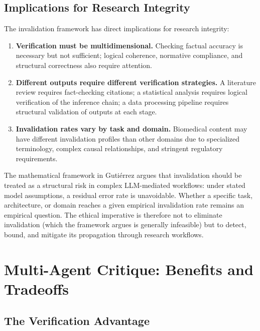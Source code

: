 \documentclass[11pt,letterpaper]{article}
\begin{document}
\subsection{Implications for Research Integrity}

The invalidation framework has direct implications for research integrity:

\begin{enumerate}[leftmargin=*]
    \item \textbf{Verification must be multidimensional.} Checking factual accuracy is necessary but not sufficient; logical coherence, normative compliance, and structural correctness also require attention.
    
    \item \textbf{Different outputs require different verification strategies.} A literature review requires fact-checking citations; a statistical analysis requires logical verification of the inference chain; a data processing pipeline requires structural validation of outputs at each stage.
    
    \item \textbf{Invalidation rates vary by task and domain.} Biomedical content may have different invalidation profiles than other domains due to specialized terminology, complex causal relationships, and stringent regulatory requirements.
\end{enumerate}

The mathematical framework in Guti\'errez \cite{gutierrez2025} argues that invalidation should be treated as a structural risk in complex LLM-mediated workflows: under stated model assumptions, a residual error rate is unavoidable. Whether a specific task, architecture, or domain reaches a given empirical invalidation rate remains an empirical question. The ethical imperative is therefore not to eliminate invalidation (which the framework argues is generally infeasible) but to detect, bound, and mitigate its propagation through research workflows.

\section{Multi-Agent Critique: Benefits and Tradeoffs}
\label{sec:multiagent}

\subsection{The Verification Advantage}
\end{document}
